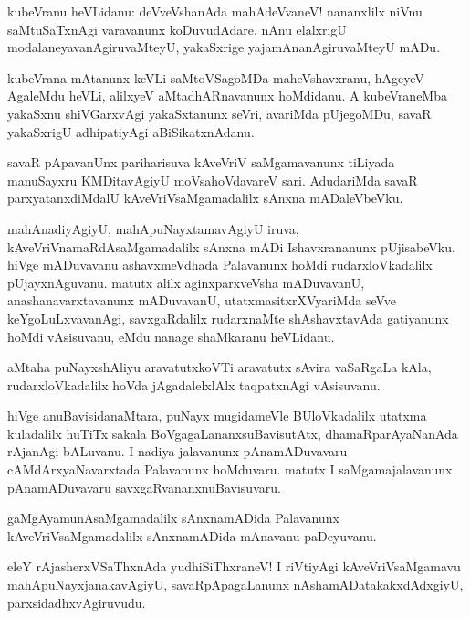 \documentclass{article}
\begin{document}
\begin{mn}
kubeVranu heVLidanu: deVveVshanAda mahAdeVvaneV!  nananxlilx niVnu saMtuSaTxnAgi varavanunx 
koDuvudAdare, nAnu elalxrigU modalaneyavanAgiruvaMteyU, yakaSxrige yajamAnanAgiruvaMteyU mADu.
\end{mn}

\begin{mn}
kubeVrana mAtanunx keVLi saMtoVSagoMDa maheVshavxranu, hAgeyeV AgaleMdu heVLi, alilxyeV 
aMtadhARnavanunx hoMdidanu. A kubeVraneMba yakaSxnu shiVGarxvAgi yakaSxtanunx  seVri, avariMda 
pUjegoMDu, savaR yakaSxrigU adhipatiyAgi aBiSikatxnAdanu.
\end{mn}

\begin{mn}
savaR pApavanUnx pariharisuva kAveVriV saMgamavanunx tiLiyada manuSayxru  KMDitavAgiyU 
moVsahoVdavareV sari. AdudariMda savaR parxyatanxdiMdalU kAveVriVsaMgamadalilx sAnxna mADaleVbeVku.
\end{mn}

\begin{mn}
mahAnadiyAgiyU, mahApuNayxtamavAgiyU iruva, kAveVriVnamaRdAsaMgamadalilx sAnxna mADi Ishavxrananunx
pUjisabeVku. hiVge mADuvavanu ashavxmeVdhada Palavanunx hoMdi rudarxloVkadalilx pUjayxnAguvanu.
matutx alilx aginxparxveVsha mADuvavanU, anashanavarxtavanunx mADuvavanU, utatxmasitxrXVyariMda
seVve keYgoLuLxvavanAgi, savxgaRdalilx rudarxnaMte shAshavxtavAda gatiyanunx hoMdi vAsisuvanu, 
eMdu nanage shaMkaranu heVLidanu.
\end{mn}

\begin{mn}
aMtaha puNayxshAliyu aravatutxkoVTi aravatutx sAvira vaSaRgaLa kAla, rudarxloVkadalilx hoVda 
jAgadalelxlAlx taqpatxnAgi vAsisuvanu.
\end{mn}

\begin{mn}
hiVge anuBavisidanaMtara, puNayx mugidameVle BUloVkadalilx utatxma kuladalilx huTiTx sakala 
BoVgagaLananxsuBavisutAtx, dhamaRparAyaNanAda rAjanAgi bALuvanu. I nadiya
jalavanunx pAnamADuvavaru cAMdArxyaNavarxtada Palavanunx hoMduvaru. matutx I saMgamajalavanunx 
pAnamADuvavaru savxgaRvananxnuBavisuvaru.
\end{mn}

\begin{mn}
gaMgAyamunAsaMgamadalilx sAnxnamADida Palavanunx kAveVriVsaMgamadalilx sAnxnamADida mAnavanu 
paDeyuvanu.
\end{mn}

\begin{mn}
eleY rAjasherxVSaThxnAda yudhiSiThxraneV!  I riVtiyAgi kAveVriVsaMgamavu mahApuNayxjanakavAgiyU,
savaRpApagaLanunx nAshamADatakakxdAdxgiyU, parxsidadhxvAgiruvudu.
\end{mn}
\end{document}
